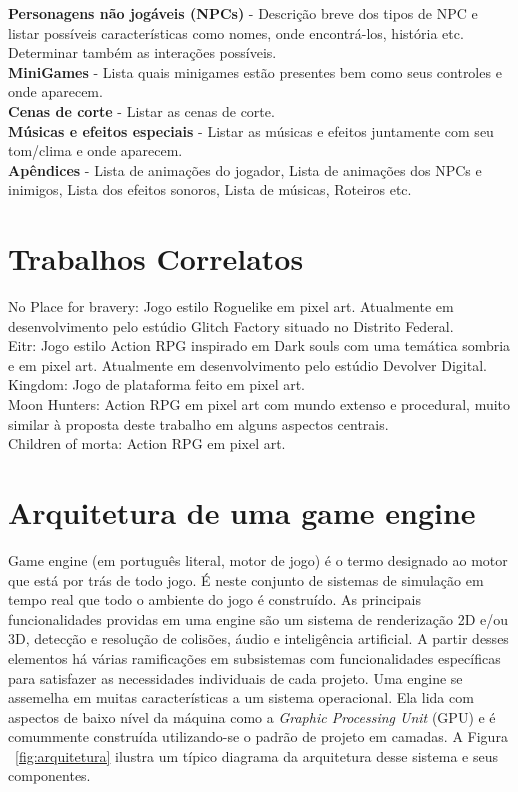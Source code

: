 \documentclass[12pt, 
openright, 
oneside, 
a4paper,    
brazil]{facom-ufu-abntex2}
\begin{document}
\textbf{Personagens não jogáveis (NPCs)} - Descrição breve dos tipos de NPC e listar possíveis características como nomes, onde encontrá-los, história etc. Determinar também as interações possíveis.\\
\textbf{MiniGames} - Lista quais minigames estão presentes bem como seus controles e onde aparecem.\\
\textbf{Cenas de corte} - Listar as cenas de corte.\\
\textbf{Músicas e efeitos especiais} - Listar as músicas e efeitos juntamente com seu tom/clima e onde aparecem.\\
\textbf{Apêndices} - Lista de animações do jogador, Lista de animações dos NPCs e inimigos, Lista dos efeitos sonoros, Lista de músicas, Roteiros etc.

\chapter{Trabalhos Correlatos}
\label{sec:trabcorr}

No Place for bravery: Jogo estilo Roguelike em pixel art. Atualmente em desenvolvimento pelo estúdio Glitch Factory situado no Distrito Federal.\\

Eitr: Jogo estilo Action RPG inspirado em Dark souls com uma temática sombria e em pixel art. Atualmente em desenvolvimento pelo estúdio Devolver Digital.\\

Kingdom: Jogo de plataforma feito em pixel art. \\

Moon Hunters: Action RPG em pixel art com mundo extenso e procedural, muito similar à proposta deste trabalho em alguns aspectos centrais. \\

Children of morta: Action RPG em pixel art. \\


\chapter{Arquitetura de uma game engine}
Game engine (em português literal, motor de jogo) é o termo designado ao motor que está por trás de todo jogo. É neste conjunto de sistemas de simulação em tempo real que todo o ambiente do jogo é construído. As principais funcionalidades providas em uma engine são um sistema de renderização 2D e/ou 3D, detecção e resolução de colisões, áudio e inteligência artificial. A partir desses elementos há várias ramificações em subsistemas com funcionalidades específicas para satisfazer as necessidades individuais de cada projeto. Uma engine se assemelha em muitas características a um sistema operacional. Ela lida com aspectos de baixo nível da máquina como a \textit{Graphic Processing Unit} (GPU) e é comummente construída utilizando-se o padrão de projeto em camadas. A Figura ~\ref{fig:arquitetura}  ilustra um típico diagrama da arquitetura desse sistema e seus componentes.
\end{document}
